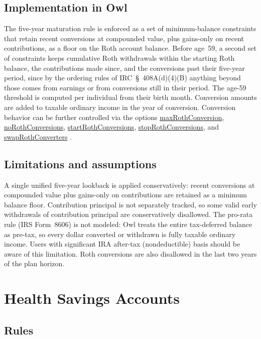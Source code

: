 \documentclass[fleqn,12pt]{report}
\newcommand{\code}[1]{\url{#1}}
\begin{document}
\subsection*{Implementation in Owl}

The five-year maturation rule is enforced as a set of minimum-balance
constraints that retain recent conversions at compounded value, plus
gains-only on recent contributions, as a floor on the Roth account balance.
Before age~59\textonehalf{}, a second set of constraints keeps cumulative Roth
withdrawals within the starting Roth balance, the contributions made since, and
the conversions past their five-year period, since by the ordering rules of
IRC~§~408A(d)(4)(B) anything beyond those comes from earnings or from
conversions still in their period.
The age-59\textonehalf{} threshold is computed per individual from their birth
month.
Conversion amounts are added to taxable ordinary income in the year of
conversion.
Conversion behavior can be further controlled via the options
\code{maxRothConversion}, \code{noRothConversions},
\code{startRothConversions}, \code{stopRothConversions}, and
\code{swapRothConverters}
\cite{irc408a,irs590b}.

\subsection*{Limitations and assumptions}

A single unified five-year lookback is applied conservatively: recent
conversions at compounded value plus gains-only on contributions are retained
as a minimum balance floor.
Contribution principal is not separately tracked, so some valid early
withdrawals of contribution principal are conservatively disallowed.
The pro-rata rule (IRS Form~8606) is not modeled: Owl treats the entire
tax-deferred balance as pre-tax, so every dollar converted or withdrawn is
fully taxable ordinary income.
Users with significant IRA after-tax (nondeductible) basis should be aware of
this limitation.
Roth conversions are also disallowed in the last two years of the plan horizon.

\section{Health Savings Accounts}
\label{Sec:HSA}
\label{sec:hsa}

\subsection*{Rules}
\end{document}
